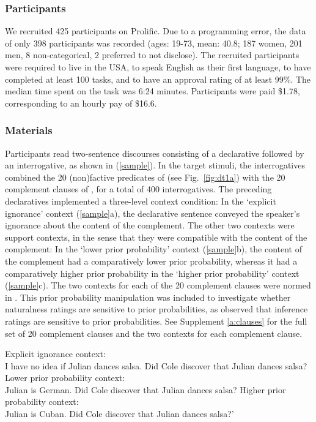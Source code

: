 \documentclass[11pt,fleqn]{article}
\newcommand{\6}{\mbox{$[\hspace*{-.6mm}[$}}
\newcommand{\9}{\mbox{$]\hspace*{-.6mm}]$}}
\begin{document}
\subsubsection{Participants}

We recruited 425 participants on Prolific. Due to a programming error, the data of only 398 participants was recorded (ages: 19-73, mean: 40.8; 187 women, 201 men, 8 non-categorical, 2 preferred to not disclose). The recruited participants were required to live in the USA, to speak English as their first language, to have completed at least 100 tasks, and to have an approval rating of at least 99\%. The median time spent on the task was 6:24 minutes. Participants were paid \$1.78, corresponding to an hourly pay of \$16.6.


\subsubsection{Materials}

Participants read two-sentence discourses consisting of a declarative followed by an interrogative, as shown in (\ref{sample}). In the target stimuli, the interrogatives combined the 20 (non)factive predicates of \citealt{degen-tonhauser-language} (see Fig.~\ref{fig:dt1a}) with the 20 complement clauses of \citealt{degen-tonhauser-language}, for a total of 400 interrogatives. The preceding declaratives implemented a three-level context condition: In the `explicit ignorance' context (\ref{sample}a), the declarative sentence conveyed the speaker's ignorance about the content of the complement. The other two contexts were support contexts, in the sense that they were compatible with the content of the complement: In the `lower prior probability' context (\ref{sample}b), the content of the complement had a comparatively lower prior probability, whereas it had a comparatively higher prior probability in the `higher prior probability' context (\ref{sample}c). The two contexts for each of the 20 complement clauses were normed in \citealt{degen-tonhauser-openmind}. This prior probability manipulation was included to investigate whether naturalness ratings are sensitive to prior probabilities, as \citealt{degen-tonhauser-openmind} observed that inference ratings are sensitive to prior probabilities. See Supplement \ref{a:clauses} for the full set of 20 complement clauses and the two contexts for each complement clause.

\begin{exe}
\ex\label{sample}
\begin{xlist}
\ex Explicit ignorance context: \\ I have no idea if Julian dances salsa. Did Cole discover that Julian dances salsa?
\ex Lower prior probability context: \\ Julian is German. Did Cole discover that Julian dances salsa?
\ex Higher prior probability context: \\ Julian is Cuban. Did Cole discover that Julian dances salsa?'
\end{xlist}
\end{exe}
\end{document}
